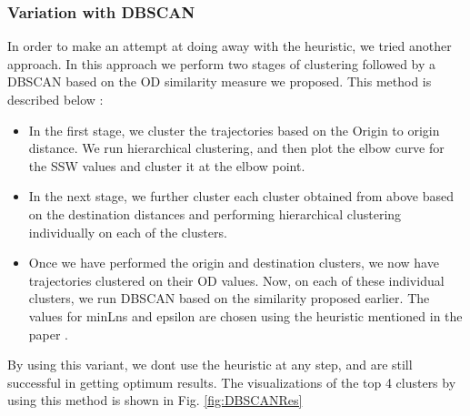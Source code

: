 \subsubsection{Variation with DBSCAN} 
In order to make an attempt at doing away with the heuristic, we tried another approach. In this approach we perform two stages of clustering followed by a DBSCAN based on the OD similarity measure we proposed. This method is described below : 
\begin{itemize}
\item In the first stage, we cluster the trajectories based on the Origin to origin distance. We run hierarchical clustering, and then plot the elbow curve for the SSW values and cluster it at the elbow point. 
\item In the next stage, we further cluster each cluster obtained from above based on the destination distances and performing hierarchical clustering individually on each of the clusters.
\item Once we have performed the origin and destination clusters, we now have trajectories clustered on their OD values. Now, on each of these individual clusters, we run DBSCAN based on the similarity proposed earlier. The values for minLns and epsilon are chosen using the heuristic mentioned in the paper .
\end{itemize}
By using this variant, we dont use the heuristic at any step, and are still successful in getting optimum results. The visualizations of the top 4 clusters by using this method is shown in Fig. \ref{fig:DBSCANRes}
